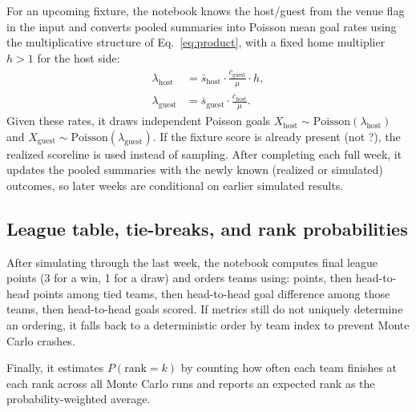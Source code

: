 \documentclass[11pt,a4paper]{article}
\begin{document}
For an upcoming fixture, the notebook knows the host/guest from the venue flag in the input and converts pooled summaries into Poisson mean goal rates using the multiplicative structure of Eq.~\eqref{eq:product}, with a fixed home multiplier $h>1$ for the host side:
\begin{align*}
  \lambda_{\text{host}} &= \bar{s}_{\text{host}} \cdot \frac{\bar{c}_{\text{guest}}}{\mu} \cdot h, \\
  \lambda_{\text{guest}} &= \bar{s}_{\text{guest}} \cdot \frac{\bar{c}_{\text{host}}}{\mu}.
\end{align*}
Given these rates, it draws independent Poisson goals
$X_{\text{host}} \sim \mathrm{Poisson}(\lambda_{\text{host}})$ and
$X_{\text{guest}} \sim \mathrm{Poisson}(\lambda_{\text{guest}})$.
If the fixture score is already present (not ?), the realized scoreline is used instead of sampling.
After completing each full week, it updates the pooled summaries with the newly known (realized or simulated) outcomes, so later weeks are conditional on earlier simulated results.

\subsection{League table, tie-breaks, and rank probabilities}
After simulating through the last week, the notebook computes final league points (3 for a win, 1 for a draw) and orders teams using:
points,
then head-to-head points among tied teams,
then head-to-head goal difference among those teams,
then head-to-head goals scored.
If metrics still do not uniquely determine an ordering, it falls back to a deterministic order by team index to prevent Monte Carlo crashes.

Finally, it estimates $P(\mathrm{rank}=k)$ by counting how often each team finishes at each rank across all Monte Carlo runs and reports an expected rank as the probability-weighted average.
\end{document}
